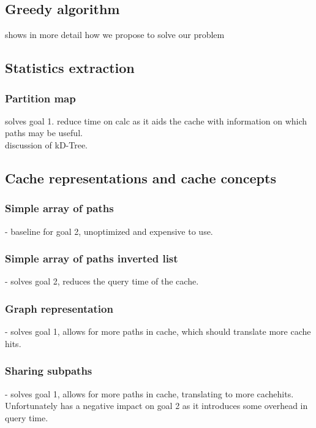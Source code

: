 \subsection{Greedy algorithm}
shows in more detail how we propose to solve our problem


\subsection{Statistics extraction}

\subsubsection{Partition map} 
solves goal 1. reduce time on \spath calc as it aids the cache with information on which paths may be useful.\\ 
discussion of kD-Tree.


\subsection{Cache representations and cache concepts} 

\subsubsection{Simple array of paths} - baseline for goal 2, unoptimized and expensive to use.

\subsubsection{Simple array of paths inverted list} - solves goal 2, reduces the query time of the cache.

\subsubsection{Graph representation} - solves goal 1, allows for more paths in cache, which should translate more cache hits.

\subsubsection{Sharing subpaths} - solves goal 1, allows for more paths in cache, translating to more cachehits. Unfortunately has a negative impact on goal 2 as it introduces some overhead in query time.

